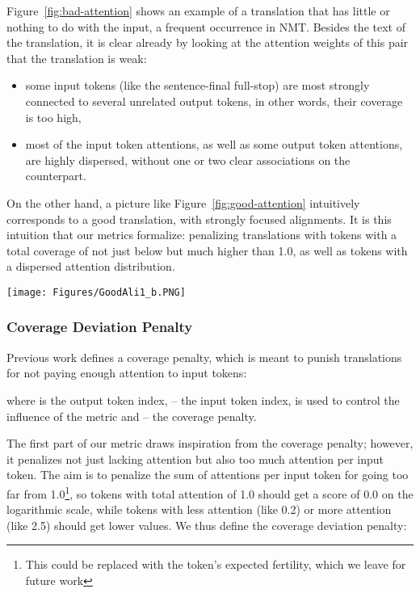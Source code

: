 \documentclass[]{article}
\begin{document}
Figure~\ref{fig:bad-attention} shows an example of a translation that has little or nothing to do with the input, a frequent occurrence in NMT. Besides the text of the translation, it is clear already by looking at the attention weights of this pair that the translation is weak:
\begin{itemize}
	\item some input tokens (like the sentence-final full-stop) are most strongly connected to several unrelated output tokens, in other words, their coverage is too high,
    \item most of the input token attentions, as well as some output token attentions, are highly dispersed, without one or two clear associations on the counterpart.
\end{itemize}
On the other hand, a picture like Figure~\ref{fig:good-attention} intuitively corresponds to a good translation, with strongly focused alignments. It is this intuition that our metrics formalize: penalizing translations with tokens with a total coverage of not just below but much higher than 1.0, as well as tokens with a dispersed attention distribution.

\begin{figure*}[t]
  \texttt{[image: Figures/GoodAli1\_b.PNG]}
  \caption{Attention alignment visualization of a good translation. Reference translation: \emph{He was a kind spirit with a big heart.}, hypothesis translation: \emph{he was a good man with a broad heart}. , , , .}
  \label{fig:good-attention}
\end{figure*}

\subsubsection*{Coverage Deviation Penalty}

Previous work \citep{bridgingGoogle} defines a coverage penalty, which is meant to punish translations for not paying enough attention to input tokens:

where  is the output token index,  -- the input token index,  is used to control the influence of the metric and  -- the coverage penalty.

The first part of our metric draws inspiration from the coverage penalty; however, it penalizes not just lacking attention but also too much attention per input token. The aim is to penalize the sum of attentions per input token for going too far from 1.0\footnote{This could be replaced with the token's expected fertility, which we leave for future work}, so tokens with total attention of 1.0 should get a score of 0.0 on the logarithmic scale, while tokens with less attention (like 0.2) or more attention (like 2.5) should get lower values. We thus define the coverage deviation penalty:
\end{document}
